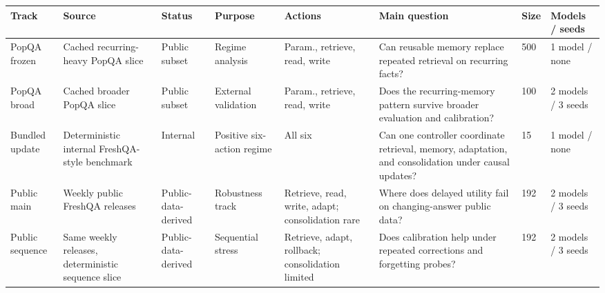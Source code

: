 \begin{tabular}{p{1.5cm}p{1.6cm}p{1.2cm}p{1.5cm}p{1.5cm}p{2.1cm}p{0.9cm}p{1.2cm}}
\toprule
Track & Source & Status & Purpose & Actions & Main question & Size & Models / seeds \\
\midrule
PopQA frozen & Cached recurring-heavy PopQA slice & Public subset & Regime analysis & Param., retrieve, read, write & Can reusable memory replace repeated retrieval on recurring facts? & 500 & 1 model / none \\
PopQA broad & Cached broader PopQA slice & Public subset & External validation & Param., retrieve, read, write & Does the recurring-memory pattern survive broader evaluation and calibration? & 100 & 2 models / 3 seeds \\
Bundled update & Deterministic internal FreshQA-style benchmark & Internal & Positive six-action regime & All six & Can one controller coordinate retrieval, memory, adaptation, and consolidation under causal updates? & 15 & 1 model / none \\
Public main & Weekly public FreshQA releases & Public-data-derived & Robustness track & Retrieve, read, write, adapt; consolidation rare & Where does delayed utility fail on changing-answer public data? & 192 & 2 models / 3 seeds \\
Public sequence & Same weekly releases, deterministic sequence slice & Public-data-derived & Sequential stress & Retrieve, adapt, rollback; consolidation limited & Does calibration help under repeated corrections and forgetting probes? & 192 & 2 models / 3 seeds \\
\bottomrule
\end{tabular}
